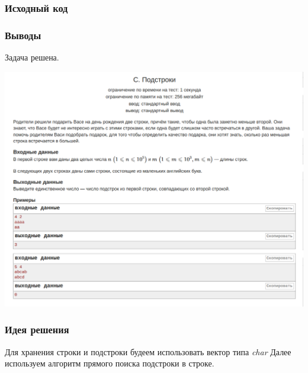 
\subsubsection*{Исходный код}


\subsubsection*{Выводы}
Задача решена.
\newline

\begin{center}
\includegraphics[width=\textwidth]{statements/Contest1C.png}
\end{center}

\subsubsection*{Идея решения}

Для хранения строки и подстроки будеем использовать вектор типа \textit{char}
Далее используем алгоритм прямого поиска подстроки в строке.

